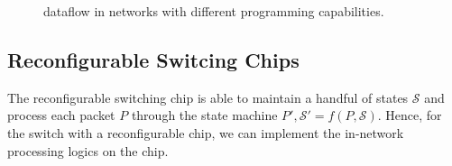 \begin{figure}[t]
\centering
{}
\hspace{0.04\textwidth}
\hspace{0.04\textwidth}
\caption{\sys dataflow in networks with different programming capabilities.}
\label{fig:impl}
\vspace{-1em}
\end{figure}

\subsection{Reconfigurable Switcing Chips}
\label{sec:p4}
The reconfigurable switching chip is able to maintain a handful of states $\mathcal{S}$ and process each packet $P$ through the state machine $P', \mathcal{S}' = f(P, \mathcal{S})$. Hence, for the switch with a reconfigurable chip, we can implement the in-network processing logics on the chip. 

